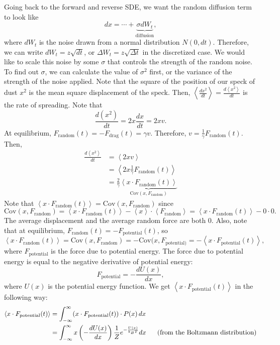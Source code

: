 \documentclass{article}
\newcommand{\Cov}{\mathrm{Cov}}
\begin{document}

Going back to the forward and reverse SDE, we want the random diffusion term to look like
\[dx = \cdots +  \underbrace{\sigma dW_t}_{\text{diffusion}},\]
where $dW_t$ is the noise drawn from a normal distribution $N(0,dt)$. Therefore, we can write $dW_t=z\sqrt{dt}$, or $\Delta W_t = z\sqrt{\Delta t}$ in the discretized case. We would like to scale this noise by some $\sigma$ that controls the strength of the random noise. To find out $\sigma$, we can calculate the value of $\sigma^2$ first, or the variance of the strength of the noise applied. Note that the square of the position of our speck of dust $x^2$ is the mean square displacement of the speck. Then, $\left<\frac{dx^2}{dt}\right>=\frac{d\left<x^2\right>}{dt}$ is the rate of spreading. Note that 
\[\frac{d(x^2)}{dt}=2x\frac{dx}{dt}=2xv.\]
At equilibrium, $F_{\text{random}}(t) = -F_{\text{drag}}(t) = \gamma v$. Therefore, $v = \frac{1}{\gamma}F_{\text{random}}(t)$. Then, 
\begin{align*}
    \frac{d\left<x^2\right>}{dt}&=\left<2xv\right>\\
    &=\left<2x\frac{1}{\gamma}F_{\text{random}}(t)\right>\\
    &=\frac{2}{\gamma}\underbrace{\left<x\cdot F_{\text{random}}(t)\right>}_{\Cov(x, F_{\text{random}})}
\end{align*}
Note that $\left<x\cdot F_{\text{random}}(t)\right> = \Cov(x, F_{\text{random}})$ since 
\[\Cov(x, F_{\text{random}}) = \left<x\cdot F_{\text{random}}(t)\right> - \left<x\right> \cdot \left<F_{\text{random}}\right>=\left<x\cdot F_{\text{random}}(t)\right> - 0\cdot 0.\]
The average displacement and the average random force are both 0. Also, note that at equilibrium, $F_{\text{random}}(t) = - F_{\text{potential}}(t)$, so
\[\left<x\cdot F_{\text{random}}(t)\right> = \Cov(x, F_{\text{random}}) = -\Cov(x, F_{\text{potential})} = - \left<x\cdot F_{\text{potential}}(t)\right>,\]
where $F_{\text{potential}}$ is the force due to potential energy. The force due to potential energy is equal to the negative derivative of potential energy:
\[F_{\text{potential}} = -\frac{dU(x)}{dx},\]
where $U(x)$ is the potential energy function. We get $\left<x\cdot F_{\text{potential}}(t)\right>$ in the following way:
\begin{align*}
    \left<x\cdot F_{\text{potential}}(t)\right> &= \int_{-\infty}^{\infty} (x\cdot F_{\text{potential}}(t)) \cdot P(x) \,dx\\
    &= \int_{-\infty}^{\infty} x \left(-\frac{dU(x)}{dx}\right)  \frac{1}{Z} e^{-\frac{U(x)}{k_B T}} dx\hspace{6mm}\text{(from the Boltzmann distribution)}
\end{align*}
\end{document}
